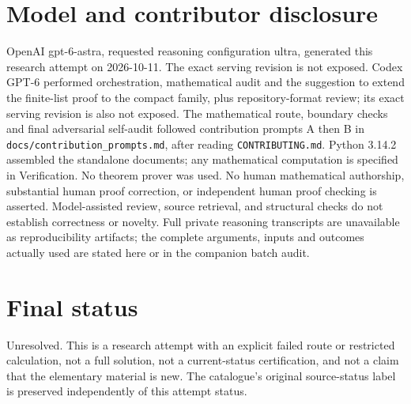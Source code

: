 \documentclass[11pt]{article}
\begin{document}
\section{Model and contributor disclosure}
OpenAI gpt-6-astra, requested reasoning configuration ultra, generated this research
attempt on 2026-10-11. The exact serving revision is not exposed. Codex GPT-6
performed orchestration, mathematical audit and the suggestion to extend the
finite-list proof to the compact family, plus repository-format review; its exact serving revision
is also not exposed. The mathematical route, boundary checks and final adversarial
self-audit followed contribution prompts A then B in
\texttt{docs/contribution\_prompts.md}, after reading \texttt{CONTRIBUTING.md}.
Python 3.14.2 assembled the standalone documents; any mathematical computation is
specified in Verification. No theorem prover was used. No human mathematical
authorship, substantial human proof correction, or independent human proof checking
is asserted. Model-assisted review, source retrieval, and structural checks do not
establish correctness or novelty. Full private reasoning transcripts are unavailable
as reproducibility artifacts; the complete arguments, inputs and outcomes actually
used are stated here or in the companion batch audit.
\section{Final status}
Unresolved. This is a research attempt with an explicit failed route or restricted
calculation, not a full solution, not a current-status certification, and not a claim
that the elementary material is new. The catalogue's original source-status label
is preserved independently of this attempt status.
\end{document}
